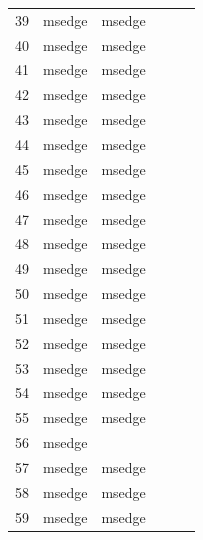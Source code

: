 \documentclass[a4paper,twoside,12pt]{book}
\begin{document}
\begin{appendices}
\begin{table}
\begin{tabular}{llllll}
		39  &  msedge &         msedge &                &                &                \\
		40  &  msedge &         msedge &                &                &                \\
		41  &  msedge &         msedge &                &                &                \\
		42  &  msedge &         msedge &                &                &                \\
		43  &  msedge &         msedge &                &                &                \\
		44  &  msedge &         msedge &                &                &                \\
		45  &  msedge &         msedge &                &                &                \\
		46  &  msedge &         msedge &                &                &                \\
		47  &  msedge &         msedge &                &                &                \\
		48  &  msedge &         msedge &                &                &                \\
		49  &  msedge &         msedge &                &                &                \\
		50  &  msedge &         msedge &                &                &                \\
		51  &  msedge &         msedge &                &                &                \\
		52  &  msedge &         msedge &                &                &                \\
		53  &  msedge &         msedge &                &                &                \\
		54  &  msedge &         msedge &                &                &                \\
		55  &  msedge &         msedge &                &                &                \\
		56  &  msedge &                &                &                &                \\
		57  &  msedge &         msedge &                &                &                \\
		58  &  msedge &         msedge &                &                &                \\
		59  &  msedge &         msedge &                &                &                \\

\end{tabular}
\end{table}
\end{appendices}
\end{document}
